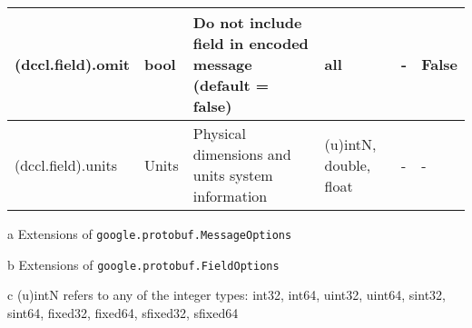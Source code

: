 \documentclass{article}
\begin{document}
\begin{table}
\begin{threeparttable}
\begin{tabular}{l|l|p{}|p{}|p{}|l}
\hline (dccl.field).omit & bool & Do not include field in encoded message (default = false)  & all & - & False \\
\hline (dccl.field).units & Units & Physical dimensions and units system information & (u)intN, double, float & - & - \\
\hline 
\end{tabular} 
\begin{tablenotes}
\item[a] Extensions of \texttt{google.protobuf.MessageOptions}
\item[b] Extensions of \texttt{google.protobuf.FieldOptions}
\item[c] (u)intN refers to any of the integer types: int32, int64, uint32, uint64, sint32, sint64, fixed32, fixed64, sfixed32, sfixed64
\end{tablenotes}
\end{threeparttable}
\end{table}
\end{document}
